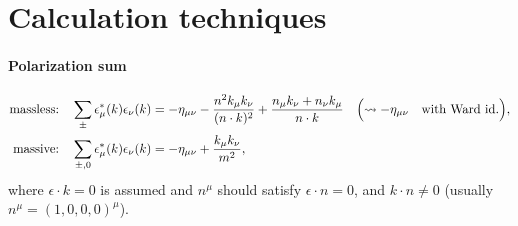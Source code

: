 \documentclass[CheatSheet]{subfiles}
\begin{document}
\summarystyle



\section{Calculation techniques}
\paragraph{Polarization sum}
\begin{alignat}{2}
\text{massless:}\quad
\sum_{\pm}\epsilon^*_\mu(k) \epsilon_\nu(k)
&=
-\eta_{\mu\nu} - \frac{n^2 k_\mu k_\nu}{(n\cdot k)^2} + \frac{n_\mu k_\nu + n_\nu k_\mu}{n\cdot k}
\quad\Bigl(\leadsto -\eta_{\mu\nu}\quad\text{with Ward id.}\Bigr),
\\
\text{massive:}\quad
\sum_{\pm,0}\epsilon^*_\mu(k) \epsilon_\nu(k)
&=
-\eta_{\mu\nu}+\frac{k_\mu k_\nu}{m^2},
\end{alignat}
where $\epsilon\cdot k = 0$ is assumed and $n^\mu$ should satisfy $\epsilon\cdot n=0$, and $k\cdot n\neq 0$ (usually $n^\mu=(1,0,0,0)^\mu$).
\end{document}
